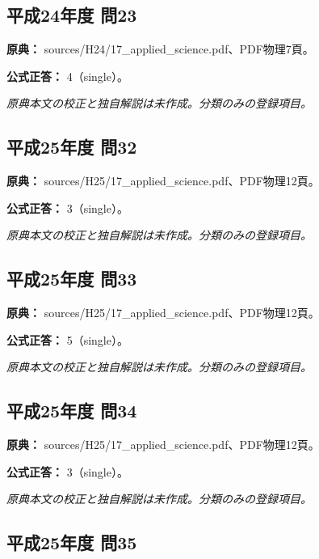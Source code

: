 \subsection{平成24年度 問23}
\label{q:h24-reg-applied-23}

\noindent\textbf{原典：} sources/H24/17\_applied\_science.pdf、PDF物理7頁。

\textbf{公式正答：} 4（single）。

\par\textit{原典本文の校正と独自解説は未作成。分類のみの登録項目。}

\subsection{平成25年度 問32}
\label{q:h25-reg-applied-32}

\noindent\textbf{原典：} sources/H25/17\_applied\_science.pdf、PDF物理12頁。

\textbf{公式正答：} 3（single）。

\par\textit{原典本文の校正と独自解説は未作成。分類のみの登録項目。}

\subsection{平成25年度 問33}
\label{q:h25-reg-applied-33}

\noindent\textbf{原典：} sources/H25/17\_applied\_science.pdf、PDF物理12頁。

\textbf{公式正答：} 5（single）。

\par\textit{原典本文の校正と独自解説は未作成。分類のみの登録項目。}

\subsection{平成25年度 問34}
\label{q:h25-reg-applied-34}

\noindent\textbf{原典：} sources/H25/17\_applied\_science.pdf、PDF物理12頁。

\textbf{公式正答：} 3（single）。

\par\textit{原典本文の校正と独自解説は未作成。分類のみの登録項目。}

\subsection{平成25年度 問35}
\label{q:h25-reg-applied-35}

